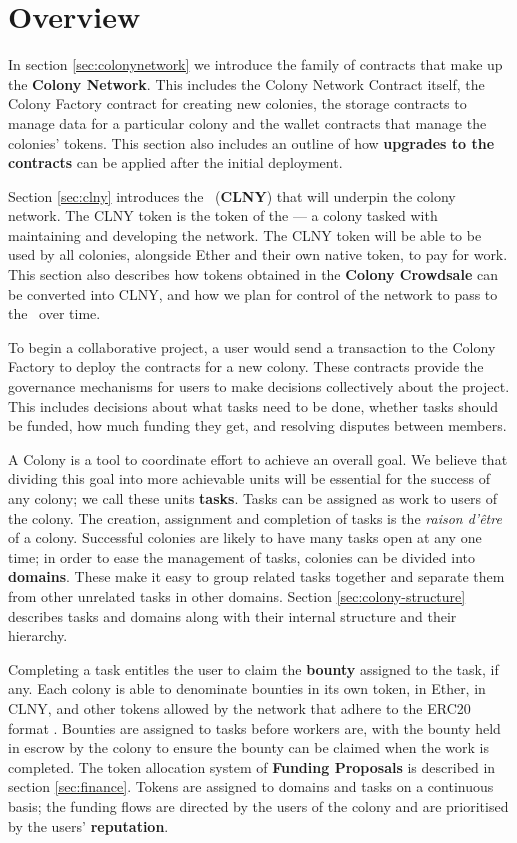 \section{Overview}

In section \ref{sec:colonynetwork} we introduce the family of contracts that make up the \textbf{Colony Network}. This includes the Colony Network Contract itself, the Colony Factory contract for creating new colonies, the storage contracts to manage data for a particular colony and the wallet contracts that manage the colonies' tokens. This section also includes an outline of how \textbf{upgrades to the contracts} can be applied after the initial deployment.

Section \ref{sec:clny} introduces the \rcts\ (\textbf{CLNY}) that will underpin the colony network. The CLNY token is the token of the \textbf{\rc} --- a colony tasked with maintaining and developing the network. The CLNY token will be able to be used by all colonies, alongside Ether and their own native token, to pay for work. This section also describes how tokens obtained in the \textbf{Colony Crowdsale} can be converted into CLNY, and how we plan for control of the network to pass to the \rc\ over time.

To begin a collaborative project, a user would send a transaction to the Colony Factory to deploy the contracts for a new colony. These contracts provide the governance mechanisms for users to make decisions collectively about the project. This includes decisions about what tasks need to be done, whether tasks should be funded, how much funding they get, and resolving disputes between members.

A Colony is a tool to coordinate effort to achieve an overall goal. We believe that dividing this goal into more achievable units will be essential for the success of any colony; we call these units \textbf{tasks}. Tasks can be assigned as work to users of the colony. The creation, assignment and completion of tasks is the \emph{raison d'être} of a colony. Successful colonies are likely to have many tasks open at any one time; in order to ease the management of tasks, colonies can be divided into \textbf{domains}. These make it easy to group related tasks together and separate them from other unrelated tasks in other domains. Section \ref{sec:colony-structure} describes tasks and domains along with their internal structure and their hierarchy.

Completing a task entitles the user to claim the \textbf{bounty} assigned to the task, if any. Each colony is able to denominate bounties in its own token, in Ether, in CLNY, and other tokens allowed by the network that adhere to the ERC20 format \cite{erc20}. Bounties are assigned to tasks before workers are, with the bounty held in escrow by the colony to ensure the bounty can be claimed when the work is completed. The token allocation system of \textbf{Funding Proposals} is described in section \ref{sec:finance}. Tokens are assigned to domains and tasks on a continuous basis; the funding flows are directed by the users of the colony and are prioritised by the users' \textbf{reputation}. 

